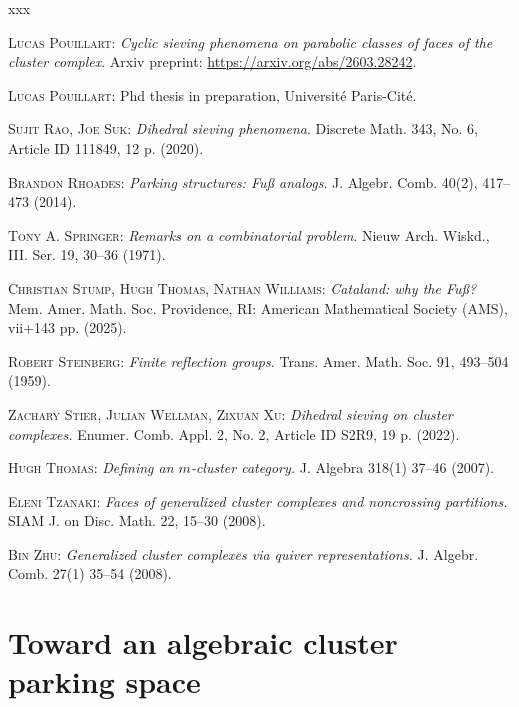 \documentclass[11pt]{article}
\theoremstyle{definition}
\begin{document}
\begin{thebibliography}{xxx}

    \textsc{Lucas Pouillart}:
    {\it Cyclic sieving phenomena on parabolic classes of faces of the cluster complex}.
    Arxiv preprint: \href{arXiv:2603.28242}{https://arxiv.org/abs/2603.28242}.

    \textsc{Lucas Pouillart}:
    Phd thesis in preparation, Université Paris-Cité.

    \textsc{Sujit Rao, Joe Suk}:
    {\it Dihedral sieving phenomena}.
    Discrete Math. 343, No. 6, Article ID 111849, 12 p. (2020).

    \textsc{Brandon Rhoades}: 
    {\it Parking structures: Fuß analogs}. 
    J. Algebr. Comb. 40(2), 417--473 (2014).

    \textsc{Tony A. Springer}:
    {\it Remarks on a combinatorial problem}.
    Nieuw Arch. Wiskd., III. Ser. 19, 30--36 (1971).

    \textsc{Christian Stump, Hugh Thomas, Nathan Williams}:
    {\it Cataland: why the Fuß?}
    Mem. Amer. Math. Soc. Providence, RI: American Mathematical Society (AMS), vii+143 pp. (2025).

  \textsc{Robert Steinberg}:
  {\it Finite reflection groups.}
  Trans. Amer. Math. Soc. 91, 493--504 (1959).
  
    \textsc{Zachary Stier, Julian Wellman, Zixuan Xu}:
    {\it Dihedral sieving on cluster complexes.}
    Enumer. Comb. Appl. 2, No. 2, Article ID S2R9, 19 p. (2022).

    \textsc{Hugh Thomas}:
    {\it Defining an $m$-cluster category.} 
    J. Algebra 318(1) 37–46  (2007).

    \textsc{Eleni Tzanaki}: 
    {\it Faces of generalized cluster complexes and noncrossing partitions.}
    SIAM J. on Disc. Math. 22, 15--30 (2008).

    \textsc{Bin Zhu}:
    {\it Generalized cluster complexes via quiver representations.} 
    J. Algebr. Comb. 27(1) 35--54 (2008).

\end{thebibliography}

\appendix

\section{Toward an algebraic cluster parking space}
\label{sec:app}
\end{document}
